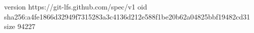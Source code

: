 version https://git-lfs.github.com/spec/v1
oid sha256:a4fe1866d32949f7315283a3c4136d212e588f1be20b62a04825bbf19482cd31
size 94227
